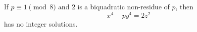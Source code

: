 \begin{proposition}
    If $p\equiv1\pmod8$ and $2$ is a biquadratic non-residue of $p$, then
\[
    x^4-py^4=2z^2
\]
    has no integer solutions.
\end{proposition}
